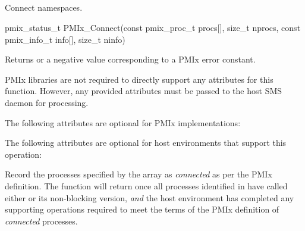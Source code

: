 \subsection{}

\summary

Connect namespaces.

\format

\cspecificstart
\begin{codepar}
pmix_status_t
PMIx_Connect(const pmix_proc_t procs[], size_t nprocs,
             const pmix_info_t info[], size_t ninfo)
\end{codepar}
\cspecificend

\begin{arglist}
\end{arglist}

Returns  or a negative value corresponding to a PMIx error constant.

\reqattrstart
\ac{PMIx} libraries are not required to directly support any attributes for this function. However, any provided attributes must be passed to the host \ac{SMS} daemon for processing.

\reqattrend

\optattrstart
The following attributes are optional for \ac{PMIx} implementations:



The following attributes are optional for host environments that support this operation:


\optattrend

\descr

Record the processes specified by the  array as \textit{connected} as per the \ac{PMIx} definition. The function will return once all processes identified in  have called either  or its non-blocking version, \textit{and} the host environment has completed any supporting operations required to meet the terms of the \ac{PMIx} definition of \textit{connected} processes.


